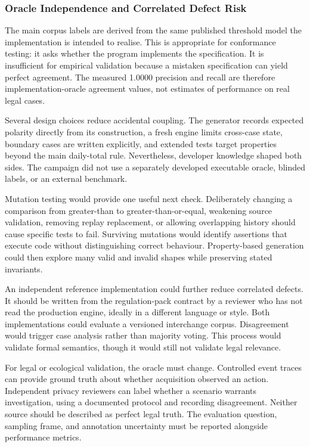 \subsubsection{Oracle Independence and Correlated Defect Risk}

The main corpus labels are derived from the same published threshold model the implementation is intended to realise. This is appropriate for conformance testing: it asks whether the program implements the specification. It is insufficient for empirical validation because a mistaken specification can yield perfect agreement. The measured 1.0000 precision and recall are therefore implementation-oracle agreement values, not estimates of performance on real legal cases.

Several design choices reduce accidental coupling. The generator records expected polarity directly from its construction, a fresh engine limits cross-case state, boundary cases are written explicitly, and extended tests target properties beyond the main daily-total rule. Nevertheless, developer knowledge shaped both sides. The campaign did not use a separately developed executable oracle, blinded labels, or an external benchmark.

Mutation testing would provide one useful next check. Deliberately changing a comparison from greater-than to greater-than-or-equal, weakening source validation, removing replay replacement, or allowing overlapping history should cause specific tests to fail. Surviving mutations would identify assertions that execute code without distinguishing correct behaviour. Property-based generation could then explore many valid and invalid shapes while preserving stated invariants.

An independent reference implementation could further reduce correlated defects. It should be written from the regulation-pack contract by a reviewer who has not read the production engine, ideally in a different language or style. Both implementations could evaluate a versioned interchange corpus. Disagreement would trigger case analysis rather than majority voting. This process would validate formal semantics, though it would still not validate legal relevance.

For legal or ecological validation, the oracle must change. Controlled event traces can provide ground truth about whether acquisition observed an action. Independent privacy reviewers can label whether a scenario warrants investigation, using a documented protocol and recording disagreement. Neither source should be described as perfect legal truth. The evaluation question, sampling frame, and annotation uncertainty must be reported alongside performance metrics.

